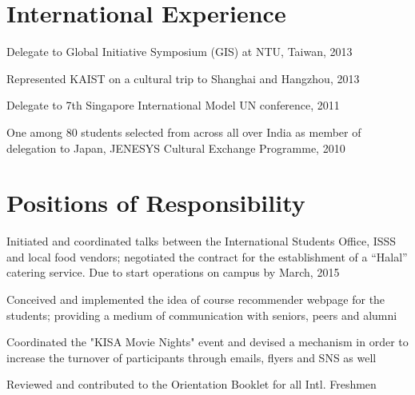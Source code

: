 \documentclass[]{deedy-resume-openfont}
\begin{document}
\hfill
\begin{minipage}[t]{0.66\textwidth} 


\section{International Experience}

\vspace{\topsep} %
\begin{tightemize} 
\item Delegate to Global Initiative Symposium (GIS) at NTU, Taiwan, 2013
\item Represented KAIST on a cultural trip to Shanghai and Hangzhou, 2013
\item Delegate to 7th Singapore International Model UN conference, 2011
\item One among 80 students selected from across all over India as member of delegation to Japan, JENESYS Cultural Exchange Programme, 2010
\end{tightemize}

\section{Positions of Responsibility}
\begin{tightemize} 
\item Initiated and coordinated talks between the International Students Office, ISSS and local food vendors; negotiated the contract for the establishment of a “Halal” catering service. Due to start operations on campus by March, 2015
\item Conceived and implemented the idea of course recommender webpage for the students; providing a medium of communication with seniors, peers and alumni
\item Coordinated the "KISA Movie Nights" event and devised a mechanism in order to increase the turnover of participants through emails, flyers and SNS as well
\item Reviewed and contributed to the Orientation Booklet for all Intl. Freshmen 
\end{tightemize}


\end{minipage}
\end{document}

